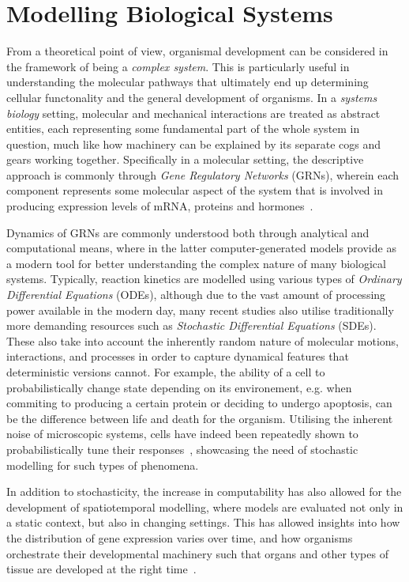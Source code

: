 \section{Modelling Biological Systems} %
\label{sec:modelling}
From a theoretical point of view, organismal development can be
considered in the framework of being a \textit{complex system}. This is
particularly useful in understanding the molecular pathways that ultimately end
up determining cellular functonality and the general development of organisms.
In a \textit{systems biology} setting, molecular and mechanical interactions are
treated as abstract entities, each representing some fundamental part of the
whole system in question, much like how machinery can be explained by its
separate cogs and gears working together. Specifically in a molecular setting,
the descriptive approach is commonly through \textit{Gene Regulatory Networks}
(GRNs), wherein each component represents some molecular aspect of the system
that is involved in producing expression levels of mRNA, proteins and
hormones~\cite{kitano2002systems}.

Dynamics of GRNs are commonly understood both through analytical and computational means,
where in the latter computer-generated models provide as a modern tool for
better understanding the complex nature of many biological systems. Typically,
reaction kinetics are modelled using various types of \textit{Ordinary
  Differential Equations} (ODEs), although due to the vast amount of processing
power available in the modern day, many recent studies also utilise
traditionally more demanding resources such as \textit{Stochastic Differential
  Equations} (SDEs). These also take into account the inherently random nature of molecular
motions, interactions, and processes in order to capture dynamical features that
deterministic versions cannot. For example, the ability of a cell to
probabilistically change state depending on its environement, e.g.
when commiting to producing a certain protein or deciding to undergo apoptosis,
can be the difference between life and death for the organism. Utilising the
inherent noise of microscopic 
systems, cells have indeed been repeatedly shown to probabilistically tune their
responses~\cite{locke2011stochastic,losick2008stochasticity,mennstochastic}, showcasing the need of stochastic modelling for such types of
phenomena.

In addition to stochasticity, the increase in computability has also allowed for
the development of spatiotemporal modelling, where models are evaluated not only
in a static context, but also in changing settings. This has allowed insights
into how the distribution of gene expression varies over time, and how organisms
orchestrate their developmental machinery such that organs and other types of
tissue are developed at the right time~\cite{ietswaart2015spatiotemporal}. 

